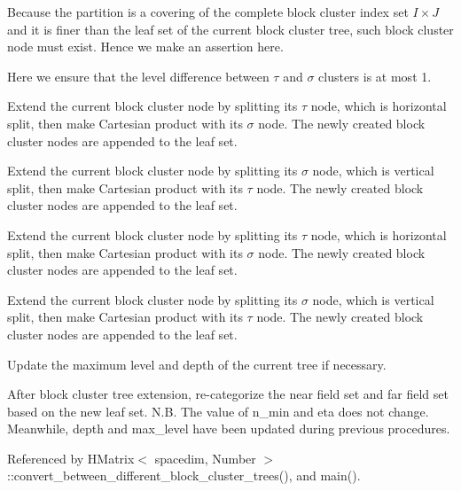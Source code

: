 Because the partition is a covering of the complete block cluster index set $I \times J$ and it is finer than the leaf set of the current block cluster tree, such block cluster node must exist. Hence we make an assertion here.

Here we ensure that the level difference between $\tau$ and $\sigma$ clusters is at most 1.

Extend the current block cluster node by splitting its $\tau$ node, which is horizontal split, then make Cartesian product with its $\sigma$ node. The newly created block cluster nodes are appended to the leaf set.

Extend the current block cluster node by splitting its $\sigma$ node, which is vertical split, then make Cartesian product with its $\tau$ node. The newly created block cluster nodes are appended to the leaf set.

Extend the current block cluster node by splitting its $\tau$ node, which is horizontal split, then make Cartesian product with its $\sigma$ node. The newly created block cluster nodes are appended to the leaf set.

Extend the current block cluster node by splitting its $\sigma$ node, which is vertical split, then make Cartesian product with its $\tau$ node. The newly created block cluster nodes are appended to the leaf set.

Update the maximum level and depth of the current tree if necessary.

After block cluster tree extension, re-\/categorize the near field set and far field set based on the new leaf set. N.\+B. The value of {\ttfamily n\+\_\+min} and {\ttfamily eta} does not change. Meanwhile, {\ttfamily depth} and {\ttfamily max\+\_\+level} have been updated during previous procedures.

Referenced by H\+Matrix$<$ spacedim, Number $>$\+::convert\+\_\+between\+\_\+different\+\_\+block\+\_\+cluster\+\_\+trees(), and main().

\mbox{\label{classBlockClusterTree_a4782e1e817b6e6265bff43baf2b1dbaa}} 
